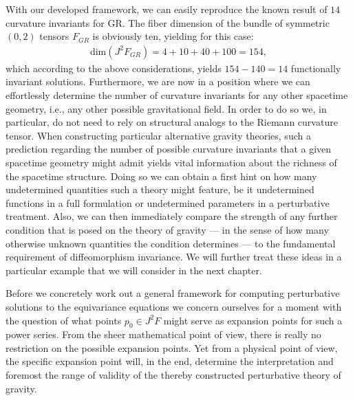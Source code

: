 With our developed framework, we can easily reproduce the known result of $14$ curvature invariants for GR. The fiber dimension of the bundle of symmetric $(0,2)$ tensors $F_{GR}$ is obviously ten, yielding for this case: 
\begin{align}
    \mathrm{dim}(J^2F_{GR}) = 4 + 10 + 40 + 100 = 154,
\end{align}
which according to the above considerations, yields $154-140=14$ functionally invariant solutions.
Furthermore, we are now in a position where we can effortlessly determine the number of curvature invariants for any other spacetime geometry, i.e., any other possible gravitational field. In order to do so we, in particular, do not need to rely on structural analogs to the Riemann curvature tensor.
When constructing particular alternative gravity theories,
such a prediction regarding the number of possible curvature invariants that a given spacetime geometry might admit yields vital information about the richness of the spacetime structure. 
Doing so we can obtain a first hint on how many undetermined quantities such a theory might feature, be it undetermined functions in a full formulation or undetermined parameters in a perturbative treatment.
Also, we can then immediately compare the strength of any further condition that is posed on the theory of gravity --- in the sense of how many otherwise unknown quantities the condition determines ---
to the fundamental requirement of diffeomorphism invariance.
We will further treat these ideas in a particular example that we will consider in the next chapter.

Before we concretely work out a general framework for computing perturbative solutions to the equivariance equations we concern ourselves for a moment with the question of what points $p_0 \in J^2F$ might serve as expansion points for such a power series. From the sheer mathematical point of view, there is really no restriction on the possible expansion points. Yet from a physical point of view, the specific expansion point will, in the end, determine the interpretation and foremost the range of validity of the thereby constructed perturbative theory of gravity. 

